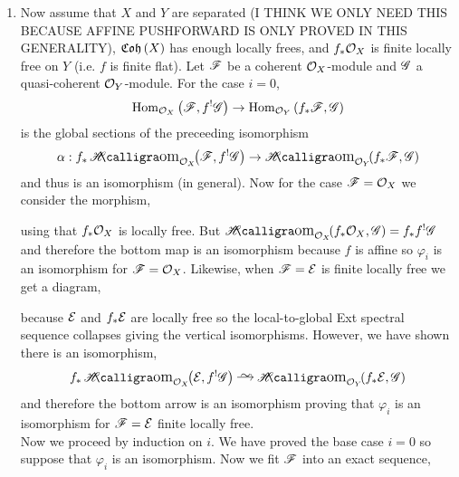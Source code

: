 \documentclass[12pt]{article}
\begin{document}
\begin{enumerate}
\item Now assume that $X$ and $Y$ are separated (I THINK WE ONLY NEED THIS BECAUSE AFFINE PUSHFORWARD IS ONLY PROVED IN THIS GENERALITY), $\mathfrak{Coh}\left(X\right)$ has enough locally frees, and $f_* \mathcal{O}_{X}$ is finite locally free on $Y$ (i.e. $f$ is finite flat). Let $\mathscr{F}$ be a coherent $\mathcal{O}_{X}$-module and $\mathscr{G}$ a quasi-coherent $\mathcal{O}_{Y}$-module. For the case $i = 0$,
\[ \mathrm{Hom}_{\mathcal{O}_{X}} \left( \mathscr{F}, f^! \mathscr{G} \right) \to \mathrm{Hom}_{\mathcal{O}_{Y}} \left( f_* \mathscr{F}, \mathscr{G} \right) \]
is the global sections of the preceeding isomorphism
\[ \alpha : f_* \shHom{\struct{X}}{\F}{f^! \G} \to \shHom{\struct{Y}}{f_* \F}{\G} \]
and thus is an isomorphism (in general). Now for the case $\mathscr{F} = \mathcal{O}_{X}$ we consider the morphism,
\begin{center}
\end{center}
using that $f_* \mathcal{O}_{X}$ is locally free. But $\shHom{\struct{X}}{f_* \struct{X}}{\G} = f_* f^! \G$ and therefore the bottom map is an isomorphism because $f$ is affine so $\varphi_i$ is an isomorphism for $\mathscr{F} = \mathcal{O}_{X}$. Likewise, when $\mathscr{F} = \mathcal{E}$ is finite locally free we get a diagram,
\begin{center}
\end{center}
because $\mathcal{E}$ and $f_* \mathcal{E}$ are locally free so the local-to-global Ext spectral sequence collapses giving the vertical isomorphisms.
However, we have shown there is an isomorphism,
\[ f_* \shHom{\struct{X}}{\E}{f^! \G} \iso \shHom{\struct{Y}}{f_* \E}{\G} \] 
and therefore the bottom arrow is an isomorphism proving that $\varphi_i$ is an isomorphism for $\mathscr{F} = \mathcal{E}$ finite locally free.
\bigskip\\
Now we proceed by induction on $i$. We have proved the base case $i = 0$ so suppose that $\varphi_i$ is an isomorphism. Now we fit $\mathscr{F}$ into an exact sequence,
\begin{center}

\end{center}
\end{enumerate}
\end{document}
